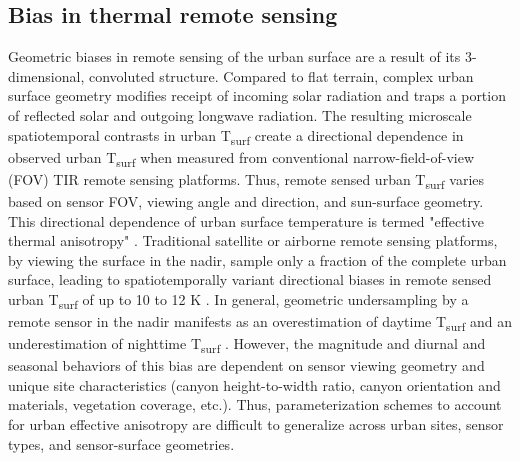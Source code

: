 \begin{bibunit}
\subsection{Bias in thermal remote sensing}
Geometric biases in remote sensing of the urban surface are a result of its 3-dimensional, convoluted structure. Compared to flat terrain, complex urban surface geometry modifies receipt of incoming solar radiation and traps a portion of reflected solar and outgoing longwave radiation. The resulting microscale spatiotemporal contrasts in urban T\textsubscript{surf} create a directional dependence in observed urban T\textsubscript{surf} when measured from conventional narrow-field-of-view (FOV) TIR remote sensing platforms. Thus, remote sensed urban T\textsubscript{surf} varies based on sensor FOV, viewing angle and direction, and sun-surface geometry. This directional dependence of urban surface temperature is termed "effective thermal anisotropy" \citep{Voogt1998a}. Traditional satellite or airborne remote sensing platforms, by viewing the surface in the nadir, sample only a fraction of the complete urban surface, leading to spatiotemporally variant directional biases in remote sensed urban T\textsubscript{surf} of up to 10 to 12 \si{\kelvin} \citep{Voogt1995,Lagouarde2012}. In general, geometric undersampling by a remote sensor in the nadir manifests as an overestimation of daytime T\textsubscript{surf} and an underestimation of nighttime T\textsubscript{surf} \citep{Adderley2015}. However, the magnitude and diurnal and seasonal behaviors of this bias are dependent on sensor viewing geometry and unique site characteristics (canyon height-to-width ratio, canyon orientation and materials, vegetation coverage, etc.). Thus, parameterization schemes to account for urban effective anisotropy are difficult to generalize across urban sites, sensor types, and sensor-surface geometries.


\end{bibunit}
